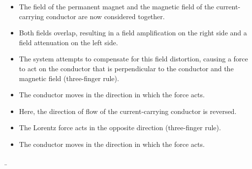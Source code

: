 \begin{frame}
{\begin{minipage}{0.74\textwidth}
\begin{itemize}
				\item The field of the permanent magnet and the magnetic field of the current-carrying conductor are now considered together.
                \item Both fields overlap, resulting in a field amplification on the right side and a field attenuation on the left side.
				\item The system attempts to compensate for this field distortion, causing a force to act on the conductor that is perpendicular to the conductor and the magnetic field (three-finger rule).
                \item The conductor moves in the direction in which the force acts.
			\end{itemize}
		\end{minipage}
		\begin{minipage}{0.25\textwidth}
		\end{minipage}
		\begin{minipage}{0.74\textwidth}
			\begin{itemize}
				\item Here, the direction of flow of the current-carrying conductor is reversed.
                \item The Lorentz force acts in the opposite direction (three-finger rule).
                \item The conductor moves in the direction in which the force acts.
			\end{itemize}
		\end{minipage}
	}
	\b{ %
		\begin{columns}
			\pause
			\pause
			\pause
\end{columns}}
\end{frame}
